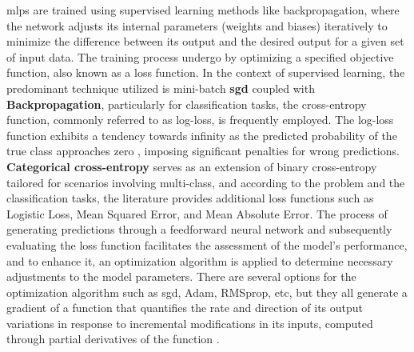 



\gls{mlp}s are trained using supervised learning methods like backpropagation, where the network adjusts its internal parameters (weights and biases) iteratively to minimize the difference between its output and the desired output for a given set of input data. %
The training process undergo by optimizing a specified objective function, also known as a loss function. In the context of supervised learning, the predominant technique utilized is mini-batch \textbf{\gls{sgd}} coupled with \textbf{Backpropagation}, particularly for classification tasks, the cross-entropy function, commonly referred to as log-loss, is frequently employed. The log-loss function exhibits a tendency towards infinity as the predicted probability of the true class approaches zero %
, imposing significant penalties for wrong predictions. \textbf{Categorical cross-entropy} serves as an extension of binary cross-entropy tailored for scenarios involving multi-class, and according to the problem and the classification tasks, the literature provides additional loss functions such as Logistic Loss, Mean Squared Error, and Mean Absolute Error. The process of generating predictions through a feedforward neural network and subsequently evaluating the loss function facilitates the assessment of the model's performance, and to enhance it, an optimization algorithm is applied to determine necessary adjustments to the model parameters. There are several options for the optimization algorithm such as \gls{sgd}, Adam, RMSprop, etc, but they all generate a gradient of a function that quantifies the rate and direction of its output variations in response to incremental modifications in its inputs, computed through partial derivatives of the function \cite{Bishop2023}. 

